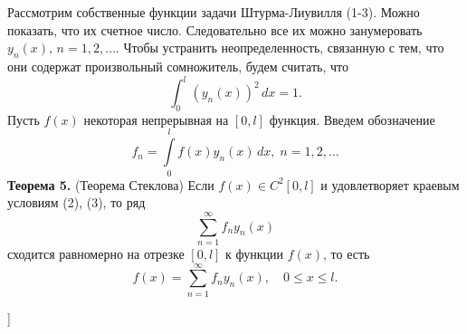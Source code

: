Рассмотрим собственные функции задачи Штурма-Лиувилля (1-3). Можно показать, что их счетное число. Следовательно все их можно занумеровать $y_n(x), \, n = 1, 2, \dots $. Чтобы устранить неопределенность, связанную с тем, что они содержат произвольный сомножитель,
будем считать, что
\begin{equation}
    \int_0^l (y_n(x))^2 \, dx = 1.
\end{equation}
Пусть $f(x)$ некоторая непрерывная на $[0, l]$ функция. Введем обозначение
\begin{equation}
    f_n = \int \limits_0^l f(x) y_n(x) \, dx, \; n=1,2,\dots
\end{equation}
\textbf{Теорема 5.} (Теорема Стеклова) Если $f(x) \in C^2[0, l]$ и удовлетворяет краевым условиям (2), (3), то ряд
\begin{equation}
    \sum \limits_{n=1}^{\infty} f_n y_n(x)
\end{equation}
сходится равномерно на отрезке $[0, l]$ к функции $f(x)$, то есть
\begin{equation}
    f(x) = \sum \limits_{n=1}^{\infty} f_n y_n(x), \quad 0 \leq x \leq l.
\end{equation}

\bigbreak
[\cite[page 67]{denisov2}]
